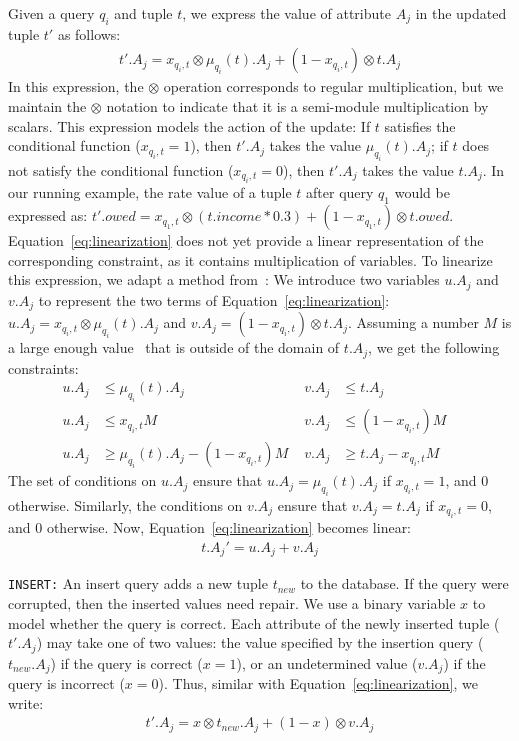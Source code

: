 Given a query $q_i$ and tuple $t$, we express the value of attribute $A_j$ in the updated tuple $t'$ as follows:
\begin{align}
\label{eq:linearization}
t'.A_j = x_{q_i, t}\otimes \mu_{q_i}(t).A_j + (1-x_{q_i, t})\otimes t.A_j 
\end{align} 
In this expression, the $\otimes$ operation corresponds to regular
multiplication, but we maintain the $\otimes$ notation to indicate
that it is a semi-module multiplication by scalars. This expression
models the action of the update: If $t$ satisfies the conditional
function ($x_{q_i, t}=1$), then $t'.A_j$ takes the value
$\mu_{q_i}(t).A_j$; if $t$ does not satisfy the conditional function
($x_{q_i, t}=0$), then $t'.A_j$ takes the value $t.A_j$.
In our running example, the rate value of a tuple $t$ after query $q_1$ would be expressed as:
$t'.owed = x_{q_1, t}\otimes (t.income*0.3) + (1-x_{q_1, t})\otimes t.owed$.
Equation~\eqref{eq:linearization} does not yet provide a linear
representation of the corresponding constraint, as it contains
multiplication of variables. To linearize this expression, we adapt a
method from~\cite{tiresias}: We introduce two variables $u.A_j$ and
$v.A_j$ to represent the two terms of
Equation~\eqref{eq:linearization}: $u.A_j=x_{q_i, t}\otimes
\mu_{q_i}(t).A_j$ and $v.A_j=(1-x_{q_i, t})\otimes t.A_j$. Assuming a
number $M$ is a large enough value~\cite{bazaraa2011linear} that is outside of the domain of $t.A_j$, we get the
following constraints:
\begin{align}
\label{eq:uv}
u.A_j &\!\leq\! \mu_{q_i}(t).A_j   &v.A_j &\!\leq\! t.A_j &\nonumber\\
u.A_j &\!\leq\! x_{q_i, t}M        &v.A_j &\!\leq\! (1\!-\!x_{q_i, t})M &\\
u.A_j &\!\geq\! \mu_{q_i}(t).A_j \!-\! (1\!-\! x_{q_i, t})M \phantom{i} 
&v.A_j &\!\geq\! t.A_j \!-\! x_{q_i, t}M &\nonumber
\end{align}
The set of conditions on $u.A_j$ ensure that $u.A_j = \mu_{q_i}(t).A_j$ if $x_{q_i, t}=1$, and $0$ otherwise. Similarly, 
the conditions on $v.A_j$ ensure that $v.A_j = t.A_j$ if $x_{q_i, t}=0$, and $0$ otherwise.  
Now, Equation~\eqref{eq:linearization} becomes linear:
\begin{align}
\label{eq:tnew}
t.A_j' = u.A_j + v.A_j
\end{align}

\noindent\texttt{INSERT:}
An insert query adds a new tuple $t_{new}$ to the database.  If the query were 
corrupted, then the inserted values need repair. We use a binary variable $x$ to model whether the query is correct.  Each attribute of the newly inserted tuple ($t'.A_j$) may take one of two values: the value specified by the insertion query ($t_{new}.A_j$) if the query is correct ($x=1$), or an undetermined value ($v.A_j$) if the query is incorrect ($x=0$).  Thus, similar with Equation~\eqref{eq:linearization}, we write:
\begin{eqnarray}
\label{eq:insert}
t'.A_j = x \otimes t_{new}.A_j + (1-x) \otimes v.A_j 
\end{eqnarray}


